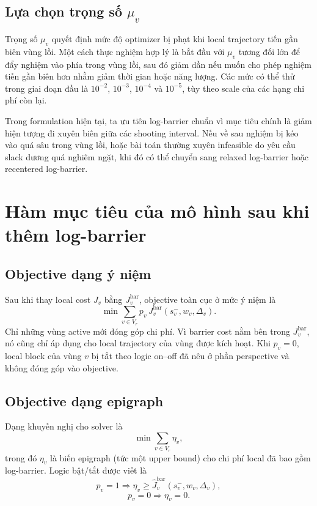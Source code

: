 \documentclass[12pt]{article}
\begin{document}
\subsection{Lựa chọn trọng số $\mu_v$}

Trọng số $\mu_v$ quyết định mức độ optimizer bị phạt khi local trajectory tiến gần biên vùng lồi. Một cách thực nghiệm hợp lý là bắt đầu với $\mu_v$ tương đối lớn để đẩy nghiệm vào phía trong vùng lồi, sau đó giảm dần nếu muốn cho phép nghiệm tiến gần biên hơn nhằm giảm thời gian hoặc năng lượng. Các mức có thể thử trong giai đoạn đầu là $10^{-2}$, $10^{-3}$, $10^{-4}$ và $10^{-5}$, tùy theo scale của các hạng chi phí còn lại.

Trong formulation hiện tại, ta ưu tiên log-barrier chuẩn vì mục tiêu chính là giảm hiện tượng đi xuyên biên giữa các shooting interval. Nếu về sau nghiệm bị kéo vào quá sâu trong vùng lồi, hoặc bài toán thường xuyên infeasible do yêu cầu slack dương quá nghiêm ngặt, khi đó có thể chuyển sang relaxed log-barrier hoặc recentered log-barrier.

\section{Hàm mục tiêu của mô hình sau khi thêm log-barrier}

\subsection{Objective dạng ý niệm}

Sau khi thay local cost $J_v$ bằng $J_v^{\mathrm{bar}}$, objective toàn cục ở mức ý niệm là
\begin{equation}
\min \sum_{v\in V_r}p_v\,J_v^{\mathrm{bar}}(s_v^-,w_v,\Delta_v).
\label{eq:global_cost_barrier_conceptual}
\end{equation}
Chỉ những vùng active mới đóng góp chi phí. Vì barrier cost nằm bên trong $J_v^{\mathrm{bar}}$, nó cũng chỉ áp dụng cho local trajectory của vùng được kích hoạt. Khi $p_v=0$, local block của vùng $v$ bị tắt theo logic on--off đã nêu ở phần perspective và không đóng góp vào objective.

\subsection{Objective dạng epigraph}

Dạng khuyến nghị cho solver là
\begin{equation}
\min \sum_{v\in V_r}\eta_v,
\label{eq:global_cost_barrier_epigraph}
\end{equation}
trong đó $\eta_v$ là biến epigraph (tức một upper bound) cho chi phí local đã bao gồm log-barrier. Logic bật/tắt được viết là
\begin{equation}
p_v=1\Longrightarrow
\eta_v\ge \widehat J_v^{\mathrm{bar}}(s_v^-,w_v,\Delta_v),
\label{eq:rho_active_barrier}
\end{equation}
\begin{equation}
p_v=0\Longrightarrow \eta_v=0.
\label{eq:rho_inactive_barrier}
\end{equation}
\end{document}

